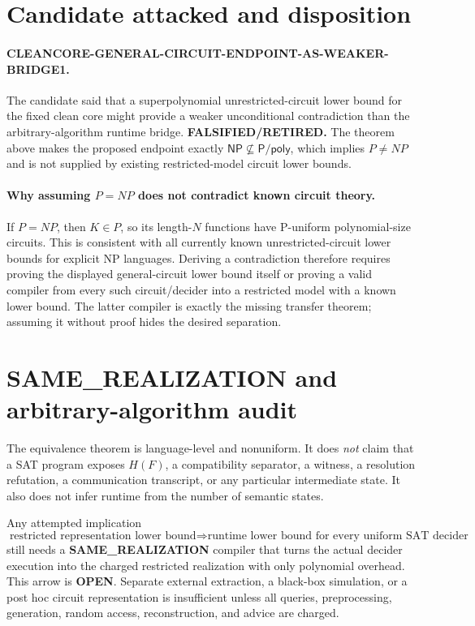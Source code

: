 \documentclass[11pt]{article}
\newcommand{\NP}{\mathsf{NP}}
\begin{document}
\section*{Candidate attacked and disposition}

\paragraph{CLEANCORE-GENERAL-CIRCUIT-ENDPOINT-AS-WEAKER-BRIDGE1.}
The candidate said that a superpolynomial unrestricted-circuit lower bound for the fixed clean core might provide a weaker unconditional contradiction than the arbitrary-algorithm runtime bridge.  \textbf{FALSIFIED/RETIRED.}  The theorem above makes the proposed endpoint exactly \(\NP\not\subseteq\mathsf{P/poly}\), which implies \(P\ne NP\) and is not supplied by existing restricted-model circuit lower bounds.

\paragraph{Why assuming \(P=NP\) does not contradict known circuit theory.}
If \(P=NP\), then \(K\in P\), so its length-\(N\) functions have P-uniform polynomial-size circuits.  This is consistent with all currently known unrestricted-circuit lower bounds for explicit NP languages.  Deriving a contradiction therefore requires proving the displayed general-circuit lower bound itself or proving a valid compiler from every such circuit/decider into a restricted model with a known lower bound.  The latter compiler is exactly the missing transfer theorem; assuming it without proof hides the desired separation.

\section*{SAME\_REALIZATION and arbitrary-algorithm audit}

The equivalence theorem is language-level and nonuniform.  It does \emph{not} claim that a SAT program exposes \(H(F)\), a compatibility separator, a witness, a resolution refutation, a communication transcript, or any particular intermediate state.  It also does not infer runtime from the number of semantic states.

Any attempted implication
\[
\text{restricted representation lower bound}
\Longrightarrow
\text{runtime lower bound for every uniform SAT decider}
\]
still needs a \textbf{SAME\_REALIZATION} compiler that turns the actual decider execution into the charged restricted realization with only polynomial overhead.  This arrow is \textbf{OPEN}.  Separate external extraction, a black-box simulation, or a post hoc circuit representation is insufficient unless all queries, preprocessing, generation, random access, reconstruction, and advice are charged.
\end{document}
